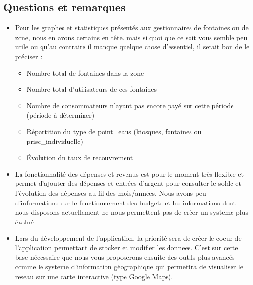 \documentclass[a4paper, 11pt]{article}
\begin{document}
  \subsection{Questions et remarques}
  \begin{itemize}
    \item Pour les graphes et statistiques présentés aux gestionnaires de \glspl{fontaine} ou de \gls{zone}, nous en avons certains en tête, mais si quoi que ce soit vous semble peu utile ou qu'au contraire il manque quelque chose d'essentiel, il serait bon de le préciser :
    \begin{itemize}
      \item Nombre total de \glspl{fontaine} dans la \gls{zone}
      \item Nombre total d'\glspl{utilisateur} de ces \glspl{fontaine}
      \item Nombre de \glspl{consommateur} n'ayant pas encore payé sur cette période (période à déterminer)
      \item Répartition du type de \glspl{point_eau} (kiosques, \glspl{fontaine} ou \gls{prise_individuelle})
      \item Évolution du taux de recouvrement
    \end{itemize}
    \item La fonctionnalité des dépenses et revenus est pour le moment très flexible et permet d'ajouter des dépenses et entrées d'argent pour consulter le solde et l'évolution des dépenses au fil des mois/années. Nous avons peu d'informations sur le fonctionnement des budgets et les informations dont nous disposons actuellement ne nous permettent pas de créer un \gls{systeme} plus évolué.
    \item Lors du développement de l'\gls{application}, la priorité sera de créer le coeur de l'\gls{application} permettant de stocker et modifier les \glspl{donnee}. C'est sur cette base nécessaire que nous vous proposerons ensuite des outils plus avancés comme le \gls{systeme} d'information géographique qui permettra de visualiser le \gls{reseau} sur une carte interactive (type Google Maps).

\end{itemize}
\end{document}

